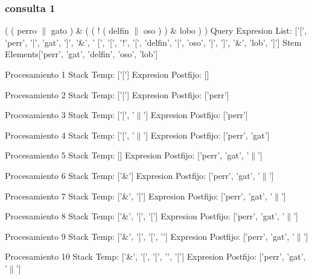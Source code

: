 \subsubsection{consulta 1}
( ( perro $\|$ gato ) \& ( ( ! ( delfin $\|$ oso ) ) \&  lobo ) ) \newline
Query Expresion List: ['[', 'perr', '|', 'gat', ']', '\&', ' [', '[', '!', '[', 'delfin', '|', 'oso', ']', ']', '\&', 'lob', ']']
Stem Elements['perr', 'gat', 'delfin', 'oso', 'lob']

Procesamiento 1
\newline Stack Temp: ['[']
\newline Expresion Postfijo: []


Procesamiento 2
\newline Stack Temp: ['[']
\newline Expresion Postfijo: ['perr']


Procesamiento 3
\newline Stack Temp: ['[', '$\|$']
\newline Expresion Postfijo: ['perr']


Procesamiento 4
\newline Stack Temp: ['[', '$\|$']
\newline Expresion Postfijo: ['perr', 'gat']


Procesamiento 5
\newline Stack Temp: []
\newline Expresion Postfijo: ['perr', 'gat', '$\|$']


Procesamiento 6
\newline Stack Temp: ['\&']
\newline Expresion Postfijo: ['perr', 'gat', '$\|$']


Procesamiento 7
\newline Stack Temp: ['\&', '[']
\newline Expresion Postfijo: ['perr', 'gat', '$\|$']


Procesamiento 8
\newline Stack Temp: ['\&', '[', '[']
\newline Expresion Postfijo: ['perr', 'gat', '$\|$']


Procesamiento 9
\newline Stack Temp: ['\&', '[', '[', '\!']
\newline Expresion Postfijo: ['perr', 'gat', '$\|$']


Procesamiento 10
\newline Stack Temp: ['\&', '[', '[', '\!', '[']
\newline Expresion Postfijo: ['perr', 'gat', '$\|$']


